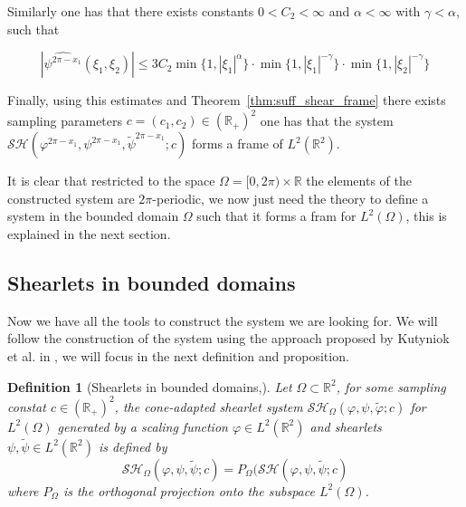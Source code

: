 \documentclass[a4paper]{article}
\newtheorem{definition}{Definition}
\begin{document}
Similarly one has that there exists constants $0< C_2 <\infty$ and $\alpha<\infty$ with $\gamma<\alpha$, such that

$$
|\widehat{\psi^{2\pi-x_1}}(\xi_1,\xi_2)| \leq 3C_2\min\{1,|\xi_1|^{\alpha}\}\cdot \min\{1,|\xi_1|^{-\gamma}\}\cdot\min\{1,|\xi_2|^{-\gamma}\}
$$

\bigskip

Finally, using this estimates and Theorem~\ref{thm:suff_shear_frame} there exists sampling parameters $c=(c_1,c_2)\in (\mathbb{R}_+)^2$ one has that the system $\mathcal{SH}(\varphi^{2\pi-x_1},\psi^{2\pi-x_1},\tilde{\psi}^{2\pi-x_1};c)$ forms a frame of $L^2(\mathbb{R}^2)$.

\bigskip

It is clear that restricted to the space $\Omega=[0,2\pi)\times\mathbb{R}$ the elements of the constructed system are $2\pi$-periodic, we now just need the theory to define a system in the bounded domain $\Omega$ such that it forms a fram for $L^2(\Omega)$, this is explained in the next section.

\subsection{Shearlets in bounded domains}

Now we have all the tools to construct the system we are looking for. We will follow the construction of the system using the approach proposed by Kutyniok et al. in \cite{ShearBounded}, we will focus in the next definition and proposition.

\begin{definition}[Shearlets in bounded domains,\cite{ShearBounded}]
\label{def:shearbound}
Let $\Omega\subset\mathbb{R}^2$, for some sampling constat $c\in(\mathbb{R}_+)^2$, the cone-adapted shearlet system $\mathcal{SH}_{\Omega}(\varphi,\psi,\tilde{\varphi};c)$ for $L^2(\Omega)$ generated by a scaling function $\varphi\in L^2(\mathbb{R}^2)$ and shearlets $\psi,\tilde{\psi}\in L^2(\mathbb{R}^2)$ is defined by
$$
\mathcal{SH}_{\Omega}(\varphi,\psi,\tilde{\psi};c)=P_{\Omega}(\mathcal{SH}(\varphi,\psi,\tilde{\psi};c)
$$
where $P_{\Omega}$ is the orthogonal projection onto the subspace $L^2(\Omega)$. 
\end{definition}

\bigskip
\end{document}
